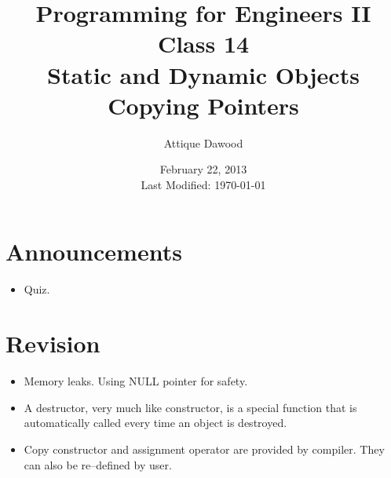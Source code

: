\documentclass[12pt,a4paper]{article}
\title{\vspace{-2cm}Programming for Engineers II\\Class 14\\Static and Dynamic Objects\\Copying Pointers}
\author{Attique Dawood}
\date{February 22, 2013\\[0.2cm] Last Modified: \today}
\begin{document}
\maketitle
\section{Announcements}
\begin{itemize}
\item Quiz.
\end{itemize}
\section{Revision}
\begin{itemize}
\item Memory leaks. Using NULL pointer for safety.
\item A destructor, very much like constructor, is a special function that is automatically called every time an object is destroyed.
\item Copy constructor and assignment operator are provided by compiler. They can also be re--defined by user.
\end{itemize}
\end{document}
